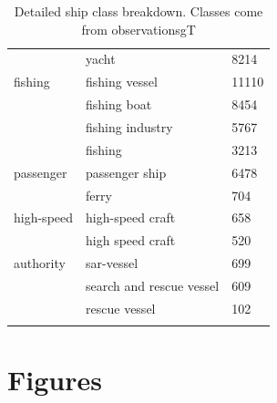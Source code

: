 \begin{longtable}{l|l|l}
           & yacht & 8214 \\
  fishing & fishing vessel & 11110 \\
          & fishing boat & 8454 \\
          & fishing industry & 5767 \\
          & fishing & 3213 \\
  passenger & passenger ship & 6478 \\
            & ferry & 704 \\
  high-speed & high-speed craft & 658 \\
             & high speed craft & 520 \\
  authority & sar-vessel & 699 \\
            & search and rescue vessel & 609 \\
            & rescue vessel & 102 \\
  \caption[Detailed ship classes]{Detailed ship class breakdown. Classes come from observationsgT}
  \label{table:ship-class-breakdown}
\end{longtable}






\chapter{Figures}
\label{sec:figures}

